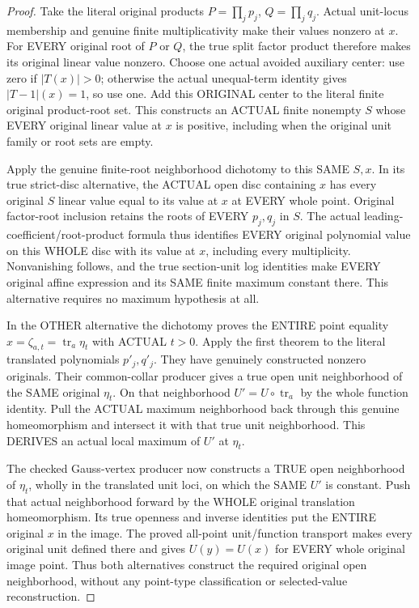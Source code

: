 \begin{proof}
Take the literal original products $P=\prod_jp_j$, $Q=\prod_jq_j$.
Actual unit-locus membership and genuine finite multiplicativity make their
values nonzero at $x$. For EVERY original root of $P$ or $Q$, the true
split factor product therefore makes its original linear value nonzero.
Choose one actual avoided auxiliary center: use zero if $|T(x)|>0$;
otherwise the actual unequal-term identity gives $|T-1|(x)=1$, so use one.
Add this ORIGINAL center to the literal finite original product-root set.
This constructs an ACTUAL finite nonempty $S$ whose EVERY original linear
value at $x$ is positive, including when the original unit family or root
sets are empty.

Apply the genuine finite-root neighborhood dichotomy to this SAME $S,x$.
In its true strict-disc alternative, the ACTUAL open disc containing $x$
has every original $S$ linear value equal to its value at $x$ at EVERY
whole point. Original factor-root inclusion retains the roots of EVERY
$p_j,q_j$ in $S$. The actual leading-coefficient/root-product formula thus
identifies EVERY original polynomial value on this WHOLE disc with its
value at $x$, including every multiplicity. Nonvanishing follows, and the
true section-unit log identities make EVERY original affine expression
and its SAME finite maximum constant there. This alternative requires no
maximum hypothesis at all.

In the OTHER alternative the dichotomy proves the ENTIRE point equality
$x=\zeta_{a,t}=\operatorname{tr}_a\eta_t$ with ACTUAL $t>0$.
Apply the first theorem to the literal translated polynomials $p'_j,q'_j$.
They have genuinely constructed nonzero originals. Their common-collar
producer gives a true open unit neighborhood of the SAME original $\eta_t$.
On that neighborhood $U'=U\circ\operatorname{tr}_a$ by the whole function
identity. Pull the ACTUAL maximum neighborhood back through this genuine
homeomorphism and intersect it with that true unit neighborhood. This
DERIVES an actual local maximum of $U'$ at $\eta_t$.

The checked Gauss-vertex producer now constructs a TRUE open neighborhood
of $\eta_t$, wholly in the translated unit loci, on which the SAME $U'$
is constant. Push that actual neighborhood forward by the WHOLE original
translation homeomorphism. Its true openness and inverse identities put
the ENTIRE original $x$ in the image. The proved all-point unit/function
transport makes every original unit defined there and gives
$U(y)=U(x)$ for EVERY whole original image point. Thus both alternatives
construct the required original open neighborhood, without any point-type
classification or selected-value reconstruction.
\end{proof}

